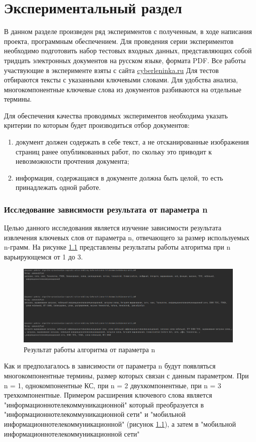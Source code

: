 \chapter{Экспериментальный раздел}
В данном разделе произведен ряд экспериментов с полученным, в ходе написания проекта, программным обеспечением.
Для проведения серии экспериментов необходимо подготовить набор тестовых входных данных, представляющих собой тридцать электронных документов на русском языке, формата PDF.
Все работы участвующие в эксперименте взяты с сайта \href{https://cyberleninka.ru/article}{cyberleninka.ru}
Для тестов отбираются тексты с указанными ключевыми словами.
Для удобства анализа, многокомпонентные ключевые слова из документов разбиваются на отдельные термины.

Для обеспечения качества проводимых экспериментов необходима указать критерии по которым будет производиться отбор документов:
\begin{enumerate}
	\item документ должен содержать в себе текст, а не отсканированные изображения страниц ранее опубликованных работ, по скольку это приводит к невозможности прочтения документа;
	\item информация, содержащаяся в документе должна быть целой, то есть принадлежать одной работе.
\end{enumerate}

\subsection{Исследование зависимости результата от параметра n}
Целью данного исследования является изучение зависимости результата извлечения ключевых слов от параметра n, отвечающего за размер используемых n-грамм.
На рисунке \ref{fig:experiment24} представлены результаты работы алгоритма при n варьирующемся от 1 до 3.

\begin{figure}[!h]
	\centering
	\includegraphics[width=1\linewidth]{src/img/experiment/experiment_2_4}
	\caption{Результат работы алгоритма от параметра n}
	\label{fig:experiment24}
\end{figure}
Как и предполагалось в зависимости от параметра n будут появляться многокомпонентные термины, размер которых связан с  данным параметром.
При n = 1, однокомпонентные КС, при n = 2 двухкомпонентные, при n = 3 трехкомпонентные.
Примером расширения ключевого слова является "информационнотелекоммуникационной" который преобразуется в "информационнотелекоммуникационной сети" и "мобильной информационнотелекоммуникационной" (рисунок \ref{fig:experiment24}), а затем в "мобильной информационнотелекоммуникационной сети"

